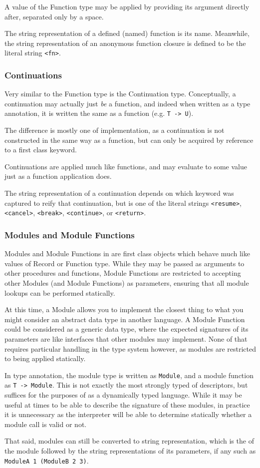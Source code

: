 A value of the Function type may be applied by providing its argument directly after,
separated only by a space.

The string representation of a defined (named) function is its name. Meanwhile, the
string representation of an anonymous function closure is defined to be the literal
string \texttt{<fn>}.

\subsubsection{Continuations}

Very similar to the Function type is the Continuation type. Conceptually, a continuation
may actually just \emph{be} a function, and indeed when written as a type annotation, it
is written the same as a function (e.g. \texttt{T -> U}).

The difference is mostly one of implementation, as a continuation is not constructed in
the same way as a function, but can only be acquired by reference to a first class keyword.

Continuations are applied much like functions, and may evaluate to some value just as a
function application does.

The string representation of a continuation depends on which keyword was captured to
reify that continuation, but is one of the literal strings \texttt{<resume>}, \texttt{<cancel>},
\texttt{<break>}, \texttt{<continue>}, or \texttt{<return>}.

\subsubsection{Modules and Module Functions}

Modules and Module Functions in \Trilogy{} are first class objects which behave much
like values of Record or Function type. While they may be passed as arguments
to other procedures and functions, Module Functions are restricted to accepting other
Modules (and Module Functions) as parameters, ensuring that all module lookups can be
performed statically.

At this time, a Module allows you to implement the closest thing to what you might
consider an abstract data type in another language. A Module Function could be considered
as a generic data type, where the expected signatures of its parameters are like interfaces that
other modules may implement. None of that requires particular handling in the type system
however, as modules are restricted to being applied statically.

In type annotation, the module type is written as \texttt{Module}, and a module function
as \texttt{T -> Module}. This is not exactly the most strongly typed of descriptors,
but suffices for the purposes of \Trilogy{} as a dynamically typed language. While it may
be useful at times to be able to describe the signature of these modules, in practice it
is unnecessary as the interpreter will be able to determine statically whether a module
call is valid or not.

That said, modules can still be converted to string representation, which is the
of the module followed by the string representations of its parameters, if any
such as \texttt{ModuleA 1 (ModuleB 2 3)}.
